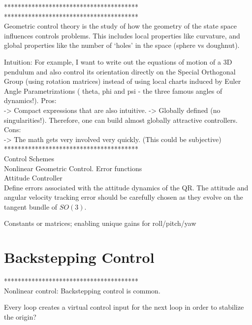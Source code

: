 ***************************************\\


***************************************\\

Geometric control theory is the study of how the geometry of the state space influences controls problems. This includes local properties like curvature, and global properties like the number of `holes’ in the space (sphere vs doughnut).

Intuition:  For example, I want to write out the equations of motion of a 3D pendulum and also control its orientation directly on the Special Orthogonal Group (using rotation matrices)  instead of using local charts induced by Euler Angle Parametrizations ( theta, phi and psi - the three famous angles of dynamics!).
Pros:\\
->  Compact expressions that are also intuitive.
-> Globally defined (no singularities!). Therefore, one can build almost globally attractive controllers.\\
Cons:\\
-> The math gets very involved very quickly. (This could be subjective)
***************************************\\

Control Schemes\\
Nonlinear Geometric Control. Error functions\\

Attitude Controller\\

Define errors associated with the attitude dynamics of the QR. The attitude and angular velocity tracking error should be carefully chosen as they evolve on the tangent bundle of  $ SO(3) $. \cite{Lee 2010c} 


Constants \cite{Lee2010} or matrices; enabling unique gains for roll/pitch/yaw \cite{Mellinger2011}\\

\section{Backstepping Control}

***************************************\\

Nonlinear control: Backstepping control is common.

Every loop creates a virtual control input for the next loop in order to stabilize the origin?

